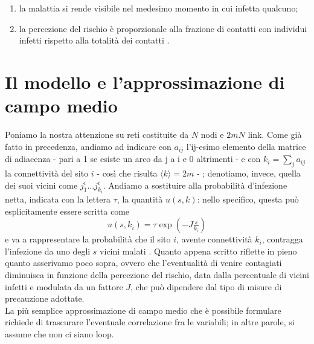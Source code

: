 \begin{enumerate}
	\item la malattia si rende visibile nel medesimo momento in cui infetta qualcuno;
	\item la percezione del rischio è proporzionale alla frazione di contatti con individui infetti rispetto alla totalità dei contatti \cite{Bagnoli2007}.
\end{enumerate}
\section{Il modello e l'approssimazione di campo medio}
Poniamo la nostra attenzione su reti costituite da $ N $ nodi e $ 2mN $ link. Come già fatto in precedenza, andiamo ad indicare con $ a_{ij} $ l'ij-esimo elemento della matrice di adiacenza - pari a 1 se esiste un arco da j a i e $ 0 $ altrimenti - e con $ k_i = \sum_{j} a_{ij} $ la connettività del sito $ i $ - così che risulta $ \langle k \rangle = 2m $ - ; denotiamo, invece, quella dei suoi vicini come $ j_{1}^i \dots j_{k_{i}}^i $. Andiamo a sostituire alla probabilità d'infezione netta, indicata con la lettera $ \tau $, la quantità $ u\left(s,k \right) $: nello specifico, questa può esplicitamente essere scritta come
\begin{equation}
	u\left(s,k_i \right) = \tau \exp(-J \tfrac{s}{k_i})
	\label{infect_sk}
\end{equation}
e va a rappresentare la probabilità che il sito $ i $, avente connettività $ k_i $, contragga l'infezione da uno degli $ s $ vicini malati \cite{Bagnoli2014}. Quanto appena scritto riflette in pieno quanto asserivamo poco sopra, ovvero che l'eventualità di venire contagiati diminuisca in funzione della percezione del rischio, data dalla percentuale di vicini infetti e modulata da un fattore $ J $, che può dipendere dal tipo di misure di precauzione adottate. 
\\La più semplice approssimazione di campo medio che è possibile formulare richiede di trascurare l'eventuale correlazione fra le variabili; in altre parole, si assume che non ci siano loop. 
